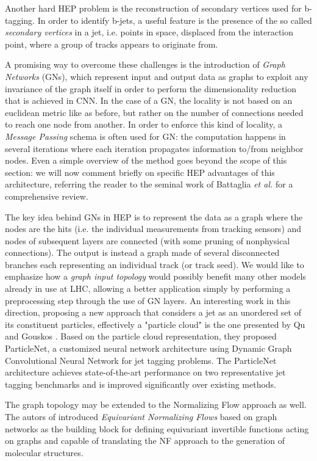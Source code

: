 Another hard HEP problem is the reconstruction of secondary vertices used for b-tagging. In order to identify b-jets, a useful feature is the presence of the so called \emph{secondary vertices} in a jet, i.e. points in space, displaced from the interaction point, where a group of tracks
appears to originate from.

A promising way to overcome these challenges is the introduction of \emph{Graph Networks} (GNs), which represent input and output data as graphs to exploit any invariance of the graph itself in order to perform the dimensionality reduction that is achieved in CNN. In the case of a GN, the locality is not based on an euclidean metric like as before, but rather on the number of connections needed to reach one node from another. In order to enforce this kind of locality, a \emph{Message Passing} schema is often used for GN: the computation happens in several iterations where each iteration propagates information to/from neighbor nodes. Even a simple overview of the method goes beyond the scope of this section: we will now comment briefly on specific HEP advantages of this architecture, referring the reader to the seminal work of Battaglia \emph{et al.} \cite{battaglia2018relational} for a comprehensive review.

The key idea behind GNs in HEP is to represent the data as a graph where the nodes are the hits (i.e. the individual measurements from tracking sensors) and nodes of subsequent layers are connected (with some pruning of nonphysical connections). The output is instead a graph made of several disconnected branches each representing an
individual track (or track seed). We would like to emphasize how a \emph{graph input topology} would possibly benefit many other models already in use at LHC, allowing a better application simply by performing a preprocessing step through the use of GN layers. An interesting work in this direction, proposing a new approach that considers a jet as an unordered set of its constituent particles, effectively a "particle cloud" is the one presented by Qu and Gouskos \cite{pj2020}. Based on the particle cloud representation, they proposed ParticleNet, a customized neural network architecture using Dynamic Graph Convolutional Neural Network for jet tagging problems. The ParticleNet architecture achieves state-of-the-art performance on two representative jet tagging benchmarks and is improved significantly over existing methods. 

The graph topology may be extended to the Normalizing Flow approach as well. The autors of \cite{https://doi.org/10.48550/arxiv.2105.09016} introduced \emph{Equivariant Normalizing Flows} based on graph networks as the building block for defining equivariant invertible functions acting on graphs and capable of translating the NF approach to the generation of molecular structures.

